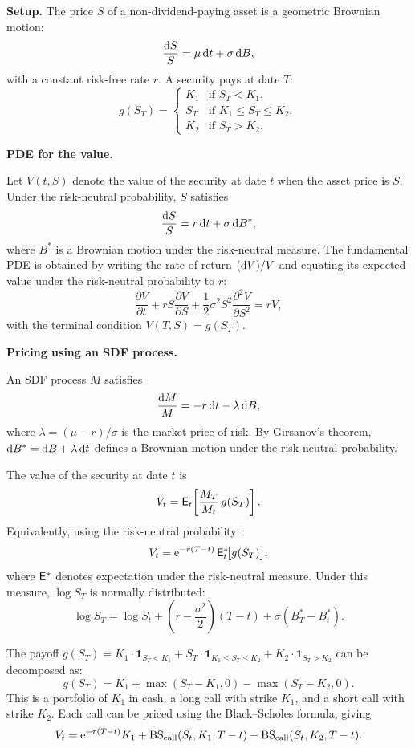
\textbf{Setup.}  The price $S$ of a non-dividend-paying asset is a geometric Brownian motion:
$$\frac{\mathrm{d} S}{S} = \mu\,\mathrm{d} t + \sigma\,\mathrm{d} B,$$
with a constant risk-free rate $r$.  A security pays at date $T$:
$$g(S_T) = \begin{cases}
K_1 & \text{if } S_T < K_1,\\
S_T & \text{if } K_1 \le S_T \le K_2,\\
K_2 & \text{if } S_T > K_2.
\end{cases}$$

\baselineskip
\textbf{PDE for the value.}

Let $V(t,S)$ denote the value of the security at date $t$ when the asset price is $S$.  Under the risk-neutral probability, $S$ satisfies
$$\frac{\mathrm{d} S}{S} = r\,\mathrm{d} t + \sigma\,\mathrm{d} B^*,$$
where $B^*$ is a Brownian motion under the risk-neutral measure.  The fundamental PDE is obtained by writing the rate of return $(\mathrm{d} V)/V$ and equating its expected value under the risk-neutral probability to $r$:
$$\frac{\partial V}{\partial t} + rS\frac{\partial V}{\partial S} + \frac{1}{2}\sigma^2 S^2\frac{\partial^2 V}{\partial S^2} = rV,$$
with the terminal condition $V(T,S) = g(S_T)$.

\baselineskip
\textbf{Pricing using an SDF process.}

An SDF process $M$ satisfies
$$\frac{\mathrm{d} M}{M} = -r\,\mathrm{d} t - \lambda\,\mathrm{d} B,$$
where $\lambda = (\mu - r)/\sigma$ is the market price of risk.  By Girsanov's theorem, $\mathrm{d} B^* = \mathrm{d} B + \lambda\,\mathrm{d} t$ defines a Brownian motion under the risk-neutral probability.

The value of the security at date $t$ is
$$V_t = \mathsf{E}_t\!\left[\frac{M_T}{M_t}\,g(S_T)\right].$$
Equivalently, using the risk-neutral probability:
$$V_t = \mathrm{e}^{-r(T-t)}\,\mathsf{E}_t^*\!\big[g(S_T)\big],$$
where $\mathsf{E}^*$ denotes expectation under the risk-neutral measure.  Under this measure, $\log S_T$ is normally distributed:
$$\log S_T = \log S_t + \left(r - \frac{\sigma^2}{2}\right)(T-t) + \sigma(B_T^* - B_t^*).$$

The payoff $g(S_T) = K_1\cdot\mathbf{1}_{S_T < K_1} + S_T\cdot\mathbf{1}_{K_1 \le S_T \le K_2} + K_2\cdot\mathbf{1}_{S_T > K_2}$ can be decomposed as:
$$g(S_T) = K_1 + \max(S_T - K_1, 0) - \max(S_T - K_2, 0).$$
This is a portfolio of $K_1$ in cash, a long call with strike $K_1$, and a short call with strike $K_2$.  Each call can be priced using the Black--Scholes formula, giving
$$V_t = \mathrm{e}^{-r(T-t)}K_1 + \text{BS}_{\text{call}}(S_t, K_1, T-t) - \text{BS}_{\text{call}}(S_t, K_2, T-t).$$


